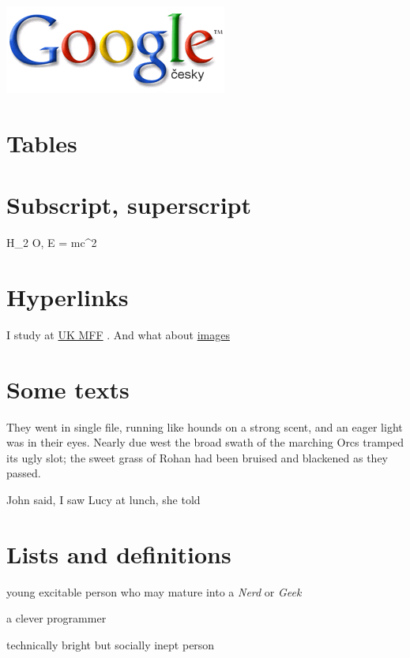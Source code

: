 \documentclass{article}
\begin{document}
\par
\includegraphics{logo.png}


\section{Tables}

\newline
\section{Subscript, superscript}

\par
H_{2}
O, E = mc^{2}

\section{Hyperlinks}

\par
I study at 
\href{http://www.mff.cuni.cz}{UK MFF}
. And
    what about 
\href{}{images}

\section{Some texts}

\par

\begin{center}
They went in single file, running like hounds on a strong scent,
and an eager light was in their eyes. Nearly due west the broad
swath of the marching {\fontsize{4}{5}\selectfont Orcs tramped}
 its ugly slot; the sweet grass
of Rohan had been bruised and blackened as they passed.

\end{center}

\par
John said, I saw Lucy at lunch, she told
\section{Lists and definitions}

\begin{description}[style=unboxed, labelwidth=\linewidth, font =\sffamily\itshape\bfseries, listparindent =0pt, before =\sffamily]

\item[ Dweeb]

young excitable person who may mature
    into a \emph{Nerd}
 or \emph{Geek}


\item[ Hacker]

a clever programmer

\item[ Nerd]

technically bright but socially inept person
\end{description}
\end{document}
